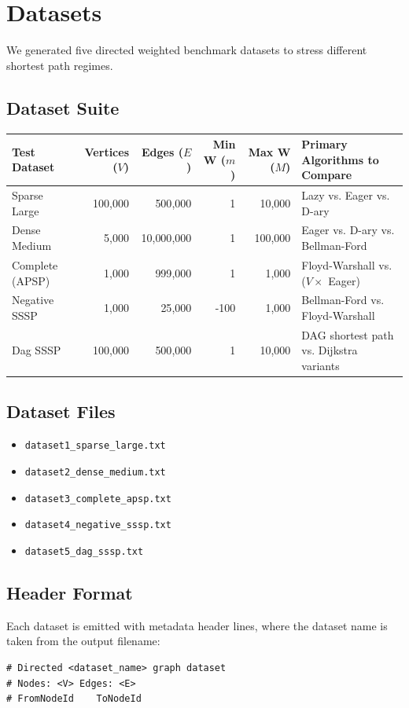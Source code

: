\section{Datasets}

We generated five directed weighted benchmark datasets to stress different shortest path regimes.

\subsection{Dataset Suite}
\begin{center}
\small
\begin{tabular}{|l|r|r|r|r|p{4.5cm}|}
\hline
\textbf{Test Dataset} & \textbf{Vertices ($V$)} & \textbf{Edges ($E$)} & \textbf{Min W ($m$)} & \textbf{Max W ($M$)} & \textbf{Primary Algorithms to Compare} \\
\hline
Sparse Large & 100{,}000 & 500{,}000 & 1 & 10{,}000 & Lazy vs. Eager vs. D-ary \\
\hline
Dense Medium & 5{,}000 & 10{,}000{,}000 & 1 & 100{,}000 & Eager vs. D-ary vs. Bellman-Ford \\
\hline
Complete (APSP) & 1{,}000 & 999{,}000 & 1 & 1{,}000 & Floyd-Warshall vs. ($V \times$ Eager) \\
\hline
Negative SSSP & 1{,}000 & 25{,}000 & -100 & 1{,}000 & Bellman-Ford vs. Floyd-Warshall \\
\hline
Dag SSSP & 100{,}000 & 500{,}000 & 1 & 10{,}000 & DAG shortest path vs. Dijkstra variants \\
\hline
\end{tabular}
\end{center}

\subsection{Dataset Files}
\begin{itemize}
	\item \texttt{dataset1\_sparse\_large.txt}
	\item \texttt{dataset2\_dense\_medium.txt}
	\item \texttt{dataset3\_complete\_apsp.txt}
	\item \texttt{dataset4\_negative\_sssp.txt}
	\item \texttt{dataset5\_dag\_sssp.txt}
\end{itemize}

\subsection{Header Format}
Each dataset is emitted with metadata header lines, where the dataset name is taken from the output filename:
\begin{verbatim}
# Directed <dataset_name> graph dataset
# Nodes: <V> Edges: <E>
# FromNodeId    ToNodeId
\end{verbatim}

